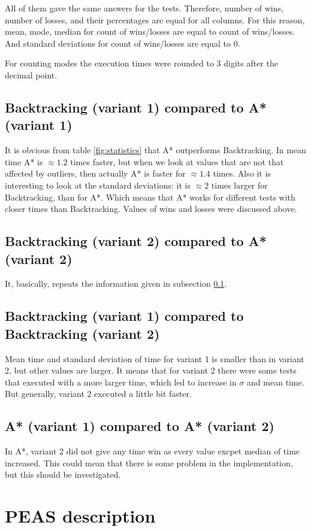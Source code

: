\documentclass{article}
\begin{document}
All of them gave the same answers for the tests.
Therefore, number of wins, number of losses, and their percentages are equal for all columns.
For this reason, mean, mode, median for count of wins/losses are equal to count of wins/losses.
And standard deviations for count of wins/losses are equal to 0.

For counting modes the execution times were rounded to 3 digits after the decimal point.

\subsection{Backtracking (variant 1) compared to A* (variant 1)} \label{backtracking_1_vs_a_star_1}
It is obvious from table \ref{fig:statistics} that A* outperforms Backtracking.
In mean time A* is $\approx 1.2$ times faster, but when we look at values that are not that affected by outliers, then actually A* is faster for $\approx 1.4$ times.
Also it is interesting to look at the standard deviations: it is $\approx 2$ times larger for Backtracking, than for A*.
Which means that A* works for different tests with closer times than Backtracking.
Values of wins and losses were discussed above.
\subsection{Backtracking (variant 2) compared to A* (variant 2)}
It, basically, repeats the information given in subsection \ref{backtracking_1_vs_a_star_1}.
\subsection{Backtracking (variant 1) compared to Backtracking (variant 2)}
Mean time and standard deviation of time for variant 1 is smaller than in variant 2, but other values are larger.
It means that for variant 2 there were some tests that executed with a more larger time, which led to increase in $\sigma$ and mean time.
But generally, variant 2 executed a little bit faster.
\subsection{A* (variant 1) compared to A* (variant 2)}
In A*, variant 2 did not give any time win as every value excpet median of time increased.
This could mean that there is some problem in the implementation, but this should be investigated.

\section{PEAS description}
\end{document}
